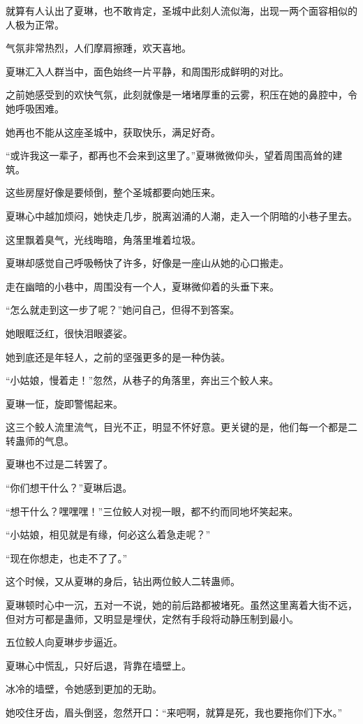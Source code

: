 \begin{this_body}
就算有人认出了夏琳，也不敢肯定，圣城中此刻人流似海，出现一两个面容相似的人极为正常。

气氛非常热烈，人们摩肩擦踵，欢天喜地。

夏琳汇入人群当中，面色始终一片平静，和周围形成鲜明的对比。

之前她感受到的欢快气氛，此刻就像是一堵堵厚重的云雾，积压在她的鼻腔中，令她呼吸困难。

她再也不能从这座圣城中，获取快乐，满足好奇。

“或许我这一辈子，都再也不会来到这里了。”夏琳微微仰头，望着周围高耸的建筑。

这些房屋好像是要倾倒，整个圣城都要向她压来。

夏琳心中越加烦闷，她快走几步，脱离汹涌的人潮，走入一个阴暗的小巷子里去。

这里飘着臭气，光线晦暗，角落里堆着垃圾。

夏琳却感觉自己呼吸畅快了许多，好像是一座山从她的心口搬走。

走在幽暗的小巷中，周围没有一个人，夏琳微仰着的头垂下来。

“怎么就走到这一步了呢？”她问自己，但得不到答案。

她眼眶泛红，很快泪眼婆娑。

她到底还是年轻人，之前的坚强更多的是一种伪装。

“小姑娘，慢着走！”忽然，从巷子的角落里，奔出三个鲛人来。

夏琳一怔，旋即警惕起来。

这三个鲛人流里流气，目光不正，明显不怀好意。更关键的是，他们每一个都是二转蛊师的气息。

夏琳也不过是二转罢了。

“你们想干什么？”夏琳后退。

“想干什么？嘿嘿嘿！”三位鲛人对视一眼，都不约而同地坏笑起来。

“小姑娘，相见就是有缘，何必这么着急走呢？”

“现在你想走，也走不了了。”

这个时候，又从夏琳的身后，钻出两位鲛人二转蛊师。

夏琳顿时心中一沉，五对一不说，她的前后路都被堵死。虽然这里离着大街不远，但对方可都是蛊师，又明显是埋伏，定然有手段将动静压制到最小。

五位鲛人向夏琳步步逼近。

夏琳心中慌乱，只好后退，背靠在墙壁上。

冰冷的墙壁，令她感到更加的无助。

她咬住牙齿，眉头倒竖，忽然开口：“来吧啊，就算是死，我也要拖你们下水。”


\end{this_body}
